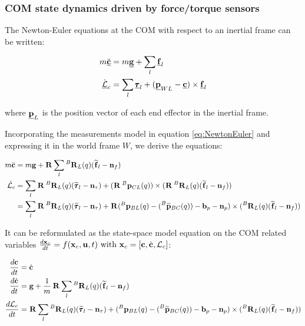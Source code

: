 \documentclass[11pt]{article}
\newcommand{\Rot}[2]{\prescript{#1}{}{\bfR}_{#2}}
\newcommand{\noise}{\bfn}
\newcommand{\posiv}[1]{\underline{\bfp}_{#1}}
\newcommand{\posi}[2]{\prescript{#1}{}{\bfp}_{#2}}
\newcommand{\posim}[2]{\prescript{#1}{}{\widetilde{\bfp}}_{#2}}
\newcommand{\forcev}[1]{\underline{\bff}_{#1}}
\newcommand{\forcem}[2]{\prescript{#1}{}{\widetilde{\bff}}_{#2}}
\newcommand{\torquev}[1]{\underline{\pmb{\tau}}_{#1}}
\newcommand{\torquem}[2]{\prescript{#1}{}{\widetilde{\pmb{\tau}}}_{#2}}
\newcommand{\AM}{\mathcal{L}}
\newcommand{\AMv}{\underline{\mathcal{L}}}
\newcommand{\COM}{\bfc}
\newcommand{\COMv}{\underline{\bfc}}
\newcommand{\gravv}{\underline{\bfg}}
\begin{document}
\subsubsection{COM state dynamics driven by force/torque sensors}
The Newton-Euler equations at the COM with respect to an inertial frame can be written:

\begin{equation}
\begin{split}
m\ddot{\COMv}&= m\gravv + \sum_l \forcev{l}
\\
\dot{\AMv}_c&= \sum_l \torquev{l} + ( \posiv{WL} - \COMv) \times \forcev{l} 
\end{split}
\label{eq:NewtonEuler}
\end{equation}

where \(\posiv{L} \) is the position vector of each end effector in the inertial frame.

Incorporating the measurements model in equation \ref{eq:NewtonEuler} and expressing it in the world frame \(W\), we derive the equations:

\begin{equation}
\begin{split}
m\ddot{\COM}&= 
m\bfg + \Rot{}{} \sum_l \Rot{B}{L}(q) (\forcem{}{l} - \noise_f) 
\\
\dot{\AM}_c&= 
\sum_l \Rot{}{}\Rot{B}{L}(q)(\torquem{}{l} - \noise_{\tau}) + (\Rot{}{} \posi{B}{CL}(q)) \times (\Rot{}{}\Rot{B}{L}(q)(\forcem{}{l} - \noise_f))
\\
&= \sum_l \Rot{}{}\Rot{B}{L}(q)(\torquem{}{l} - \noise_{\tau}) + \Rot{}{}( \posi{B}{BL}(q) - (\posim{B}{BC}(q)) -  \bfb_{p} - \noise_p) \times (\Rot{B}{L}(q)(\forcem{}{l} - \noise_f))
\end{split}
\end{equation}

It can be reformulated as the state-space model equation on the COM related variables \( \frac{d\bfx_c}{dt}= f(\bfx_c, \bfu, t)$ with $\bfx_c = [\COM, \dot{\COM}, \AM_c]\):

\begin{equation}
\begin{split}
\frac{d\COM}{dt} &= \dot{\COM} 
\\
\frac{d\dot{\bfc}}{dt}&= \bfg + \frac{1}{m} \Rot{}{} \sum_l \Rot{B}{L}(q) (\forcem{}{l} - \noise_f) 
\\
\frac{d\AM_c}{dt}&= \Rot{}{} \sum_l \Rot{B}{L}(q)(\torquem{}{l} - \noise_{\tau}) + (\posi{B}{BL}(q) - (\posim{B}{BC}(q)) -  \bfb_{p} - \noise_p) \times (\Rot{B}{L}(q)(\forcem{}{l} - \noise_f))
\end{split}
\label{eq:COMContinuous}
\end{equation}
\end{document}
